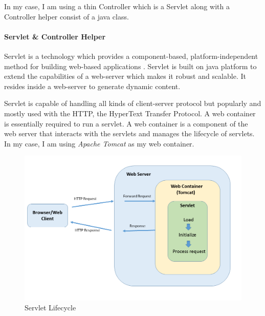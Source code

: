In my case, I am using a thin Controller which is a Servlet along with a Controller helper consist of a java class.

\paragraph{Servlet \& Controller Helper}
Servlet is a technology which provides a component-based, platform-independent method for building web-based applications \cite{servlet}. Servlet is built on java platform to extend the capabilities of a web-server which makes it robust and scalable. It resides inside a web-server to generate dynamic content.

Servlet is capable of handling all kinds of client-server protocol but popularly and mostly used with the HTTP, the HyperText Transfer Protocol. A web container is essentially required to run a servlet. A web container is a component of the web server that interacts with the servlets and manages the lifecycle of servlets. In my case, I am using \textit{Apache Tomcat} as my web container. 

\begin{figure}
	\includegraphics[width=1\textwidth]{figures/Server_Servlet}
	\caption{Servlet Lifecycle}
	\label{fig:Server_Servlet}
\end{figure}

